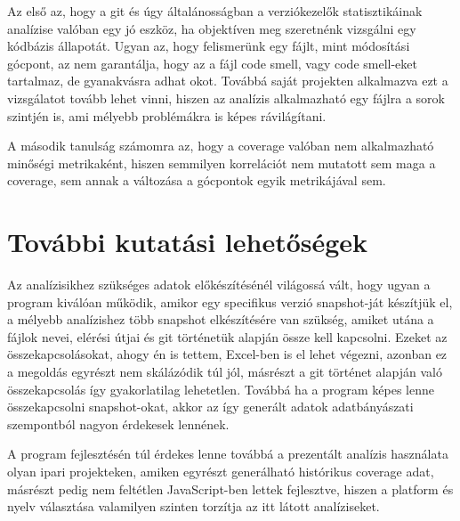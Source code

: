 Az első az, hogy a git és úgy általánosságban a verziókezelők statisztikáinak analízise valóban egy jó eszköz, ha objektíven meg szeretnénk vizsgálni egy kódbázis állapotát. Ugyan az, hogy felismerünk egy fájlt, mint módosítási gócpont, az nem garantálja, hogy az a fájl code smell, vagy code smell-eket tartalmaz, de gyanakvásra adhat okot. Továbbá saját projekten alkalmazva ezt a vizsgálatot tovább lehet vinni, hiszen az analízis alkalmazható egy fájlra a sorok szintjén is, ami mélyebb problémákra is képes rávilágítani.

A második tanulság számomra az, hogy a coverage valóban nem alkalmazható minőségi metrikaként, hiszen semmilyen korrelációt nem mutatott sem maga a coverage, sem annak a változása a gócpontok egyik metrikájával sem.

\section{További kutatási lehetőségek}

Az analízisikhez szükséges adatok előkészítésénél világossá vált, hogy ugyan a program kiválóan működik, amikor egy specifikus verzió snapshot-ját készítjük el, a mélyebb analízishez több snapshot elkészítésére van szükség, amiket utána a fájlok nevei, elérési útjai és git történetük alapján össze kell kapcsolni. Ezeket az összekapcsolásokat, ahogy én is tettem, Excel-ben is el lehet végezni, azonban ez a megoldás egyrészt nem skálázódik túl jól, másrészt a git történet alapján való összekapcsolás így gyakorlatilag lehetetlen. Továbbá ha a program képes lenne összekapcsolni snapshot-okat, akkor az így generált adatok adatbányászati szempontból nagyon érdekesek lennének.

A program fejlesztésén túl érdekes lenne továbbá a prezentált analízis használata olyan ipari projekteken, amiken egyrészt generálható histórikus coverage adat, másrészt pedig nem feltétlen JavaScript-ben lettek fejlesztve, hiszen a platform és nyelv választása valamilyen szinten torzítja az itt látott analíziseket.

